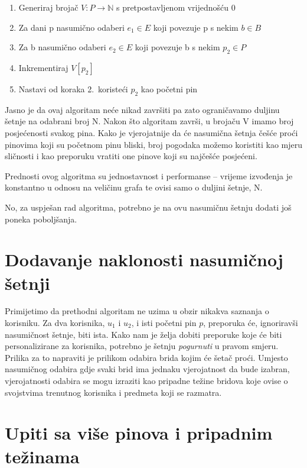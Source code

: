 \documentclass[times, utf8, seminar]{fer}
\begin{document}
\begin{enumerate}
	\item Generiraj brojač $V: P \to \mathbb{N}$ s pretpostavljenom vrijednošću 0
	\item Za dani p nasumično odaberi $e_1 \in E$ koji povezuje p s nekim $b \in B$
	\item Za b nasumično odaberi $e_2 \in E$ koji povezuje b s nekim $p_2 \in P$
	\item Inkrementiraj $V[p_2]$
	\item Nastavi od koraka 2.\ koristeći $p_2$ kao početni pin
\end{enumerate}

Jasno je da ovaj algoritam neće nikad završiti pa zato ograničavamo duljinu šetnje na odabrani broj N. Nakon što algoritam završi, u brojaču V imamo broj posjećenosti svakog pina. Kako je vjerojatnije da će nasumična šetnja češće proći pinovima koji su početnom pinu bliski, broj pogodaka možemo koristiti kao mjeru sličnosti i kao preporuku vratiti one pinove koji su najčešće posjećeni.

Prednosti ovog algoritma su jednostavnost i performanse -- vrijeme izvođenja je konstantno u odnosu na veličinu grafa te ovisi samo o duljini šetnje, N.

No, za uspješan rad algoritma, potrebno je na ovu nasumičnu šetnju dodati još poneka poboljšanja.

\section{Dodavanje naklonosti nasumičnoj šetnji}

Primijetimo da prethodni algoritam ne uzima u obzir nikakva saznanja o korisniku. Za dva korisnika, $u_1$ i $u_2$, i isti početni pin $p$, preporuka će, ignoriravši nasumičnost šetnje, biti ista. Kako nam je želja dobiti preporuke koje će biti personalizirane za korisnika, potrebno je šetnju \textit{pogurnuti} u pravom smjeru. Prilika za to napraviti je prilikom odabira brida kojim će šetač proći. Umjesto nasumičnog odabira gdje svaki brid ima jednaku vjerojatnost da bude izabran, vjerojatnosti odabira se mogu izraziti kao pripadne težine bridova koje ovise o svojstvima trenutnog korisnika i predmeta koji se razmatra.

\section{Upiti sa više pinova i pripadnim težinama}
\end{document}
